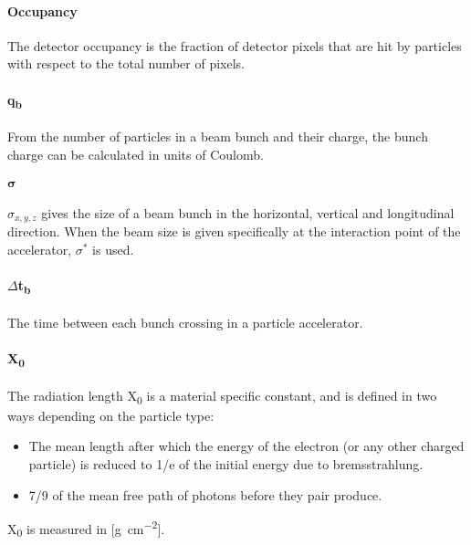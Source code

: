\paragraph{Occupancy}
The detector occupancy is the fraction of detector pixels that are hit by particles with respect to the total number of pixels.
\paragraph{q\textsubscript{b}}
From the number of particles in a beam bunch and their charge, the bunch charge can be calculated in units of Coulomb.
\paragraph{$\bm\sigma$}
$\sigma_{x,y,z}$ gives the size of a beam bunch in the horizontal, vertical and longitudinal direction. When the beam size is given specifically at the interaction point of the accelerator, $\sigma^*$ is used.
\paragraph{$\Delta$t\textsubscript{b}}
The time between each bunch crossing in a particle accelerator.
\paragraph{X\textsubscript{0}}
The radiation length X\textsubscript{0} is a material specific constant, and is defined in two ways depending on the particle type:
\begin{itemize}
 \item The mean length after which the energy of the electron (or any other charged particle) is reduced to 1/e of the initial energy due to bremsstrahlung.
 \item 7/9 of the mean free path of photons before they pair produce.
\end{itemize}
X\textsubscript{0} is measured in [\si{\gram \per\centi\meter\squared}].
